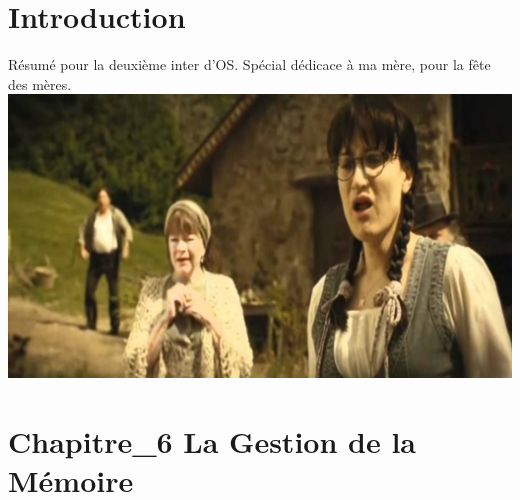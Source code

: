     
    
    
    
    

\section{Introduction}
Résumé pour la deuxième inter d'OS. Spécial dédicace à ma mère, pour la fête des mères.\\[5.5cm]
\includegraphics[scale=.35]{Img/0.PNG}
\newpage
\section{Chapitre\_6 La Gestion de la Mémoire}

















